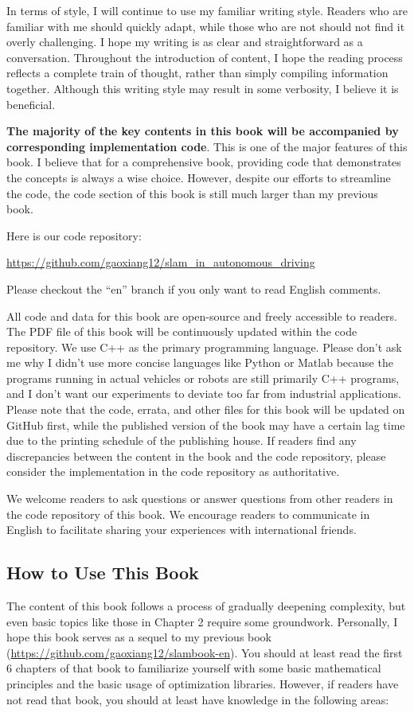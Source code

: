 In terms of style, I will continue to use my familiar writing style. Readers who are familiar with me should quickly adapt, while those who are not should not find it overly challenging. I hope my writing is as clear and straightforward as a conversation. Throughout the introduction of content, I hope the reading process reflects a complete train of thought, rather than simply compiling information together. Although this writing style may result in some verbosity, I believe it is beneficial.

\textbf{The majority of the key contents in this book will be accompanied by corresponding implementation code}. This is one of the major features of this book. I believe that for a comprehensive book, providing code that demonstrates the concepts is always a wise choice. However, despite our efforts to streamline the code, the code section of this book is still much larger than my previous book.

Here is our code repository:

\begin{mdframed}
	\centering
	\url{https://github.com/gaoxiang12/slam_in_autonomous_driving}
\end{mdframed}

Please checkout the ``en'' branch if you only want to read English comments.

All code and data for this book are open-source and freely accessible to readers. The PDF file of this book will be continuously updated within the code repository. We use C++ as the primary programming language. Please don't ask me why I didn't use more concise languages like Python or Matlab because the programs running in actual vehicles or robots are still primarily C++ programs, and I don't want our experiments to deviate too far from industrial applications. Please note that the code, errata, and other files for this book will be updated on GitHub first, while the published version of the book may have a certain lag time due to the printing schedule of the publishing house. If readers find any discrepancies between the content in the book and the code repository, please consider the implementation in the code repository as authoritative.

We welcome readers to ask questions or answer questions from other readers in the code repository of this book. We encourage readers to communicate in English to facilitate sharing your experiences with international friends.

\subsection*{How to Use This Book}
The content of this book follows a process of gradually deepening complexity, but even basic topics like those in Chapter 2 require some groundwork. Personally, I hope this book serves as a sequel to my previous book \cite{Gao2017} (\url{https://github.com/gaoxiang12/slambook-en}). You should at least read the first 6 chapters of that book to familiarize yourself with some basic mathematical principles and the basic usage of optimization libraries. However, if readers have not read that book, you should at least have knowledge in the following areas:

